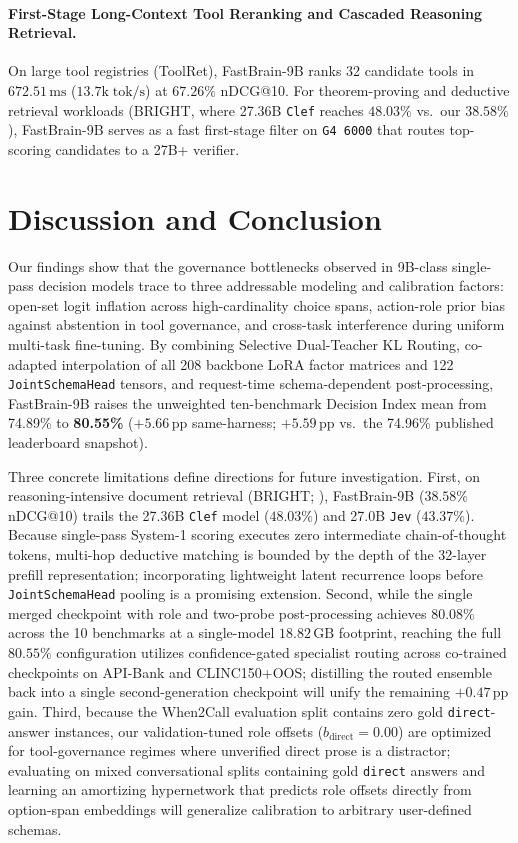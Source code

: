 \documentclass[10pt,twocolumn]{article}
\begin{document}
\paragraph{First-Stage Long-Context Tool Reranking and Cascaded Reasoning Retrieval.}
On large tool registries (ToolRet), FastBrain-9B ranks 32 candidate tools in $672.51\,\text{ms}$ ($13.7\text{k}\;\text{tok/s}$) at $67.26\%$ nDCG@10. For theorem-proving and deductive retrieval workloads (BRIGHT, where 27.36B \texttt{Clef} reaches $48.03\%$ vs.\ our $38.58\%$), FastBrain-9B serves as a fast first-stage filter on \texttt{G4 6000} that routes top-scoring candidates to a 27B+ verifier.

\section{Discussion and Conclusion}
Our findings show that the governance bottlenecks observed in 9B-class single-pass decision models trace to three addressable modeling and calibration factors: open-set logit inflation across high-cardinality choice spans, action-role prior bias against abstention in tool governance, and cross-task interference during uniform multi-task fine-tuning. By combining Selective Dual-Teacher KL Routing, co-adapted interpolation of all 208 backbone LoRA factor matrices and 122 \texttt{JointSchemaHead} tensors, and request-time schema-dependent post-processing, FastBrain-9B raises the unweighted ten-benchmark Decision Index mean from 74.89\% to \textbf{80.55\%} ($+5.66$\,pp same-harness; $+5.59$\,pp vs.\ the 74.96\% published leaderboard snapshot).

Three concrete limitations define directions for future investigation. First, on reasoning-intensive document retrieval (BRIGHT; \citealp{su2025bright}), FastBrain-9B ($38.58\%$ nDCG@10) trails the 27.36B \texttt{Clef} model ($48.03\%$) and 27.0B \texttt{Jev} ($43.37\%$). Because single-pass System-1 scoring executes zero intermediate chain-of-thought tokens, multi-hop deductive matching is bounded by the depth of the 32-layer prefill representation; incorporating lightweight latent recurrence loops before \texttt{JointSchemaHead} pooling is a promising extension. Second, while the single merged checkpoint with role and two-probe post-processing achieves $80.08\%$ across the 10 benchmarks at a single-model $18.82\,\text{GB}$ footprint, reaching the full $80.55\%$ configuration utilizes confidence-gated specialist routing across co-trained checkpoints on API-Bank and CLINC150+OOS; distilling the routed ensemble back into a single second-generation checkpoint will unify the remaining $+0.47$\,pp gain. Third, because the When2Call evaluation split contains zero gold \texttt{direct}-answer instances, our validation-tuned role offsets ($b_{\text{direct}} = 0.00$) are optimized for tool-governance regimes where unverified direct prose is a distractor; evaluating on mixed conversational splits containing gold \texttt{direct} answers and learning an amortizing hypernetwork that predicts role offsets directly from option-span embeddings will generalize calibration to arbitrary user-defined schemas.
\end{document}
